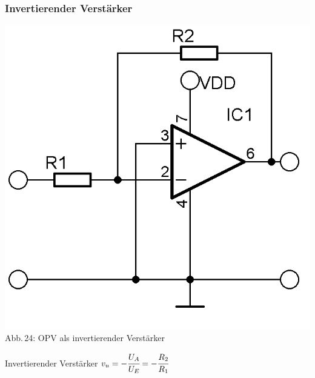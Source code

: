 \begin{frame}
  \frametitle{Invertierender Verstärker}
  \begin{minipage}{0.4\textwidth}
    \begin{center}
      \includegraphics[width=\textwidth,height=.85\textheight,keepaspectratio]{a06/OPV-Inverter.png}\\
      {\tiny Abb.\,24: OPV als invertierender Verstärker}
    \end{center}
  \end{minipage}
  \hspace{2pc}
  \begin{minipage}{0.5\textwidth}
    \centering
    \begin{block}{Invertierender Verstärker}
      $v_u = -\cfrac{U_A}{U_E} = -\cfrac{R_2}{R_1}$
    \end{block}
  \end{minipage}
\end{frame}

